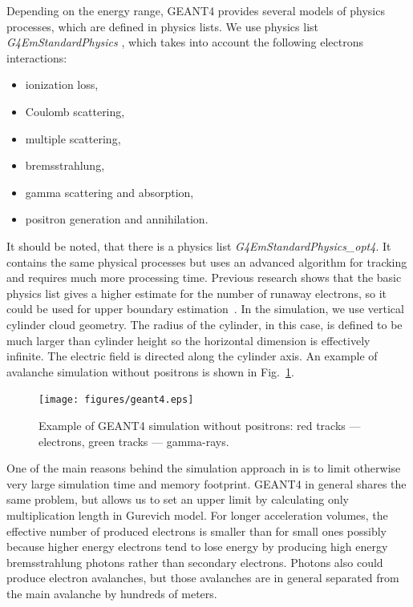 \documentclass[doublecol,linenumbers]{epl2} %
\begin{document}
	Depending on the energy range, GEANT4 provides several models of physics processes, which are defined in physics lists. We use physics list \textit{G4EmStandardPhysics} , which takes into account the following electrons interactions:
	
	\begin{itemize}
		\item ionization loss,
		\item Coulomb scattering,
		\item multiple scattering,
		\item bremsstrahlung,
		\item gamma scattering and absorption,
		\item positron generation and annihilation.
	\end{itemize}
	It should be noted, that there is a physics list \textit{G4EmStandardPhysics\_opt4}. It contains the same physical processes but uses an advanced algorithm for tracking and requires much more processing time. Previous research shows that the basic physics list gives a higher estimate for the number of runaway electrons, so it could be used for upper boundary estimation~\cite{npmdwyer}.
	In the simulation, we use vertical cylinder cloud geometry. The radius of the cylinder, in this case, is defined to be much larger than cylinder height so the horizontal dimension is effectively infinite. The electric field is directed along the cylinder axis. An example of avalanche simulation without positrons is shown in Fig.~\ref{fig:geant4}.
	\begin{figure}[h]
		\centering
		\texttt{[image: figures/geant4.eps]}
		\caption{Example of GEANT4 simulation without positrons: red tracks --- electrons, green tracks --- gamma-rays.}
		\label{fig:geant4}
	\end{figure}
	One of the main reasons behind the simulation approach in \cite{Oreshkin_2018} is to limit otherwise very large simulation time and memory footprint. GEANT4 in general shares the same problem, but allows us to set an upper limit by calculating only multiplication length in Gurevich model. For longer acceleration volumes, the effective number of produced electrons is smaller than for small ones possibly because higher energy electrons tend to lose energy by producing high energy bremsstrahlung photons rather than secondary electrons. Photons also could produce electron avalanches, but those avalanches are in general separated from the main avalanche by hundreds of meters.
	
\end{document}
